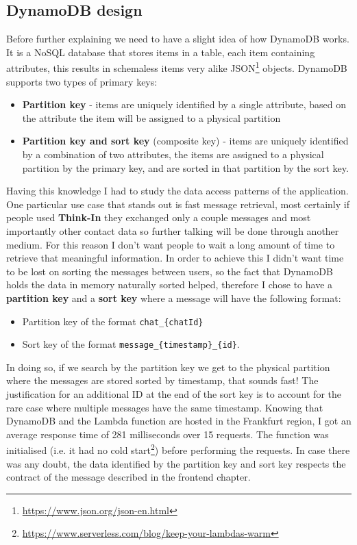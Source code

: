 \subsection{DynamoDB design}

Before further explaining we need to have a slight idea of how DynamoDB works. It is a NoSQL database that stores items in a table, each item containing attributes, this results in schemaless items very alike JSON\footnote{\href{https://www.json.org/json-en.html}{https://www.json.org/json-en.html}} objects. DynamoDB supports two types of primary keys:
\begin{itemize}
	\item \textbf{Partition key} - items are uniquely identified by a single attribute, based on the attribute the item will be assigned to a physical partition
	\item \textbf{Partition key and sort key} (composite key) - items are uniquely identified by a combination of two attributes, the items are assigned to a physical partition by the primary key, and are sorted in that partition by the sort key.
\end{itemize}

Having this knowledge I had to study the data access patterns of the application. One particular use case that stands out is fast message retrieval, most certainly if people used \textbf{Think-In} they exchanged only a couple messages and most importantly other contact data so further talking will be done through another medium. For this reason I don't want people to wait a long amount of time to retrieve that meaningful information. In order to achieve this I didn't want time to be lost on sorting the messages between users, so the fact that DynamoDB holds the data in memory naturally sorted helped, therefore I chose to have a \textbf{partition key} and a \textbf{sort key} where a message will have the following format:
\begin{itemize}
	\item Partition key of the format \verb|chat_{chatId}|
	\item Sort key of the format \verb|message_{timestamp}_{id}|.
\end{itemize}

In doing so, if we search by the partition key we get to the physical partition where the messages are stored sorted by timestamp, that sounds fast! The justification for an  additional ID at the end of the sort key is to account for the rare case where multiple messages have the same timestamp. Knowing that DynamoDB and the Lambda function are hosted in the Frankfurt region, I got an average response time of 281 milliseconds over 15 requests. The function was initialised (i.e. it had no cold start\footnote{\href{https://www.serverless.com/blog/keep-your-lambdas-warm}{https://www.serverless.com/blog/keep-your-lambdas-warm}}) before performing the requests. In case there was any doubt, the data identified by the partition key and sort key respects the contract of the message described in the frontend chapter.


